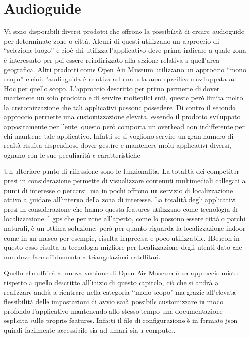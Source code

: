 \section{Audioguide}\vspace{5mm}
Vi sono disponibili diversi prodotti che offrono la possibilità di creare audioguide per determinate zone o città. Alcuni di questi utilizzano un approccio di “selezione luogo” e cioè chi utilizza l’applicativo deve prima indicare a quale zona è interessato per poi essere reindirizzato alla sezione relativa a quell’area geografica. Altri prodotti come Open Air Museum utilizzano un approccio “mono scopo” e cioè l’audioguida è relativa ad una sola area specifica e sviluppata ad Hoc per quello scopo. L’approccio descritto per primo permette di dover mantenere un solo prodotto e di servire molteplici enti, questo però limita molto la customizzazione che tali applicativi possono possedere. Di contro il secondo approccio permette una customizzazione elevata, essendo il prodotto sviluppato appositamente per l’ente; questo però comporta un overhead non indifferente per chi mantiene tale applicativo. Infatti se si vogliono servire un gran numero di realtà risulta dispendioso dover gestire e mantenere molti applicativi diversi, ognuno con le sue peculiarità e caratteristiche.\vspace{5mm}

Un ulteriore punto di riflessione sono le funzionalità. La totalità dei competitor presi in considerazione permette di visualizzare contenuti multimediali collegati a punti di interesse o percorsi, ma in pochi offrono un servizio di localizzazione attivo a guidare all’interno della zona di interesse. La totalità degli applicativi presi in considerazione che hanno questa features utilizzano come tecnologia di localizzazione il gps che per zone all’aperto, come lo possono essere città o parchi naturali, è un ottima soluzione; però per quanto riguarda la localizzazione indoor come in un museo per esempio, risulta imprecisa e poco utilizzabile. IBeacon in questo caso risulta la tecnologia migliore per localizzazione degli utenti dato che non deve fare affidamento a triangolazioni satellitari.\vspace{5mm}

	Quello che offrirà al nuova versione di Open Air Museum è un approccio misto rispetto a quello descritto all’inizio di questo capitolo, ciò che si andrà a realizzare andrà a rientrare nella categoria “mono scopo” ma grazie all’elevata flessibilità delle impostazioni di avvio sarà possibile customizzare in modo profondo l’applicativo mantenendo allo stesso tempo una documentazione esplicita sulle proprie features. Infatti il file di configurazione è in formato json quindi facilmente accessibile sia ad umani sia a computer.\vspace{5mm}





